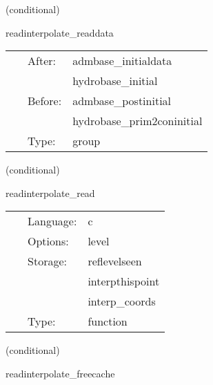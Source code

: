    (conditional) 

\hspace{5mm} readinterpolate\_readdata 

\hspace{5mm}{\it read in datasets from disk } 


\hspace{5mm}

 \begin{tabular*}{160mm}{cll} 
~ & After:  & admbase\_initialdata \\ 
~& ~ &hydrobase\_initial\\ 
~ & Before:  & admbase\_postinitial \\ 
~& ~ &hydrobase\_prim2coninitial\\ 
~ & Type:  & group \\ 
\end{tabular*} 


\vspace{5mm}

   (conditional) 

\hspace{5mm} readinterpolate\_read 

\hspace{5mm}{\it read in datasets } 


\hspace{5mm}

 \begin{tabular*}{160mm}{cll} 
~ & Language:  & c \\ 
~ & Options:  & level \\ 
~ & Storage:  & reflevelseen \\ 
~& ~ &interpthispoint\\ 
~& ~ &interp\_coords\\ 
~ & Type:  & function \\ 
\end{tabular*} 


\vspace{5mm}

   (conditional) 

\hspace{5mm} readinterpolate\_freecache 

\hspace{5mm}{\it free memory used for dataset caches } 


\hspace{5mm}

